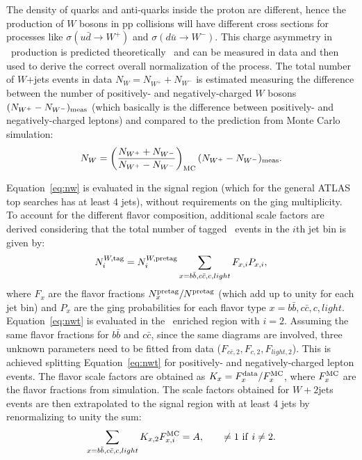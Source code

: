The density of quarks and anti-quarks inside the proton are different, hence 
the production of $W$ bosons in pp collisions will have different 
cross sections for processes like
$\sigma(u\bar{d}\to W^+)$ and $\sigma(d\bar{u}\to W^-)$. This charge
asymmetry in \wjets\ production is predicted theoretically~\cite{wasym}
and can be measured in data and then used to derive the correct
overall normalization of the process.
The total number of $W$+jets events in data $N_W=N_{W^+}+N_{W^-}$
is estimated measuring the difference between the number 
of positively- and negatively-charged $W$
bosons $(N_{W^+}-N_{W^-})_{\rm meas}$ (which basically is
the difference between positively- and negatively-charged leptons)
and compared to the prediction from Monte Carlo simulation:
\begin{equation}
N_W = \left(\frac{N_{W^+}+N_{W^-}}{N_{W^+}-N_{W^-}}\right )_{\rm MC}(N_{W^+}-N_{W^-})_{\rm meas}.
\label{eq:nw}
\end{equation}

Equation~\ref{eq:nw} is evaluated in the signal region (which for 
the general ATLAS top searches has at least 4 jets), 
without requirements on the \btag ging multiplicity.
To account for the different flavor composition, additional scale factors are derived 
considering that the total number of tagged \wjets\ 
events in the $i$th jet bin is given by:
\begin{equation}\label{eq:nwt}
N^{W,{\rm tag}}_{i}  = 
N^{W,{\rm pretag}}_{i}
\sum_{x=b\bar{b}, c\bar{c}, c, light} F_{x,i}P_{x,i},
\end{equation}
where $F_x$ are the flavor fractions $N^{\rm pretag}_x/N^{\rm pretag}$ 
(which add up to unity for each jet bin) and 
$P_x$ are the \btag ging probabilities for each flavor 
type $x = b\bar{b}, c\bar{c}, c, light$.
Equation~\ref{eq:nwt} is evaluated in the \wjets\ enriched
region with $i=2$.
Assuming the same flavor fractions for  $b\bar{b}$ and $c\bar{c}$,
since the same diagrams are involved, three unknown parameters need
to be fitted from data ($F_{c\bar{c},2}, F_{c,2}, F_{light,2}$).
This is achieved splitting Equation~\ref{eq:nwt} 
for positively- and negatively-charged lepton events. 
The flavor scale factors
are obtained as $K_x = F^{\rm data}_x/F^{\rm MC}_x$, where
$F^{\rm MC}_x$ are the flavor fractions from simulation.
The scale factors obtained for $W+2$jets events 
are then extrapolated to the
signal region with at least 4 jets by renormalizing to
unity the sum: 
\begin{equation}\label{eq:sfwn}
\sum_{x = b\bar{b}, c\bar{c}, c, light} K_{x,2} F_{x, i}^{\rm MC} = A, \qquad \neq 1 {\rm\ if\ } i \neq 2.
\end{equation}

